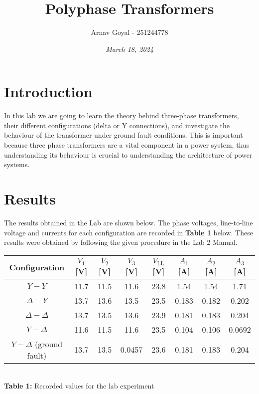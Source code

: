 \documentclass[]{report}
\title{\textbf{Polyphase Transformers}}
\date{\textit{March 18, 2024}}
\author{Arnav Goyal - 251244778}
\begin{document}
\maketitle

\section*{Introduction}

In this lab we are going to learn the theory behind three-phase transformers, their different configurations (delta or Y connections), and investigate the behaviour of the transformer under ground fault conditions. This is important because three phase transformers are a vital component in a power system, thus understanding its behaviour is crucial to understanding the architecture of power systems.

\section*{Results}

The results obtained in the Lab are shown below. The phase voltages, line-to-line voltage and currents for each configuration are recorded in \textbf{Table 1} below. These results were obtained by following the given procedure in the Lab 2 Manual.

\begin{table}[h]
	\centering
	\begin{tabular}{@{}c|ccccccc@{}}
		Configuration          			& $V_1$ [V]	& $V_2$ [V]	& $V_3$ [V]	&	$V_\text{LL}$ [V]	&	$A_1$ [A] 	& $A_2$ [A]		& $A_3$ [A]		\\ \midrule
		$Y-Y $                   		&  11.7  	&   11.5 	&   11.6 	&	23.8				&   1.54 		&   1.54		&   1.71 	 	\\
		$\Delta-Y$                  	&  13.7 	&   13.6 	&   13.5 	&   23.5				&	0.183		&   0.182		&   0.202 	 	\\
		$\Delta-\Delta$             	&  13.7 	&   13.5	&   13.6 	&  	23.9				& 	0.181 		&   0.183 		&   0.204	 	\\
		$Y-\Delta$                  	&  11.6  	&   11.5 	&   11.6 	&   23.5				&	0.104 		& 	0.106		&   0.0692 	 	\\
		$Y-\Delta$ (ground fault) 		&  13.7  	&   13.5 	&   0.0457 	&   23.6				&	0.181 		&   0.183 		&   0.204
	\end{tabular} \\ \vspace{1em}
	\textbf{Table 1:} Recorded values for the lab experiment
\end{table}
\end{document}
